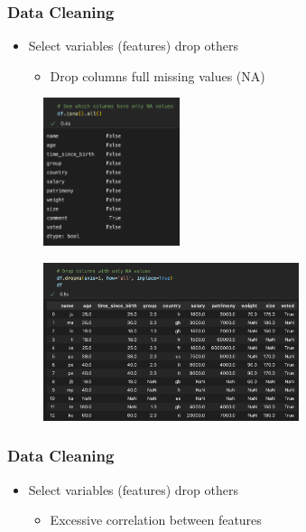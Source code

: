 \begin{frame}\frametitle{Data Cleaning}
   \begin{itemize}
      \item Select variables (features) drop others
      \begin{itemize}
         \item Drop columns full missing values (NA)
      \end{itemize}
   \end{itemize}
   \vspace{1cm}
   \begin{minipage}{0.38\linewidth}
      \begin{figure}[H]
         \includegraphics[width=4cm]{../images/illustrations/data_cleaning_detect_columns_na.png}
      \end{figure}
   \end{minipage}
   \begin{minipage}{0.58\linewidth}
      \begin{figure}[H]
         \includegraphics[width=7.5cm]{../images/illustrations/data_cleaning_drop_columns_full_na.png}
      \end{figure}
   \end{minipage}
\end{frame}


\begin{frame}\frametitle{Data Cleaning}
   \begin{itemize}
      \item Select variables (features) drop others
      \begin{itemize}
         \item Excessive correlation between features
      \end{itemize}
   \end{itemize}
\end{frame}

